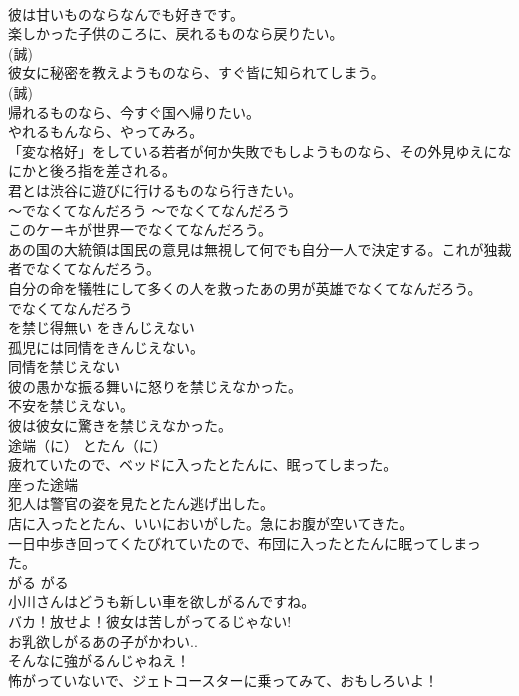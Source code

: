 \documentclass[8pt]{extreport}
\begin{document}
\begin{CJK}{UTF8}{min}
\\	彼は甘いものならなんでも好きです。   
\\	楽しかった子供のころに、戻れるものなら戻りたい。  
\\	(誠)
\\	彼女に秘密を教えようものなら、すぐ皆に知られてしまう。  
\\	(誠)
\\	帰れるものなら、今すぐ国へ帰りたい。   
\\	やれるもんなら、やってみろ。  
\\	「変な格好」をしている若者が何か失敗でもしようものなら、その外見ゆえになにかと後ろ指を差される。  
\\	君とは渋谷に遊びに行けるものなら行きたい。  
\\	〜でなくてなんだろう	〜でなくてなんだろう	
\\	このケーキが世界一でなくてなんだろう。  
\\	あの国の大統領は国民の意見は無視して何でも自分一人で決定する。これが独裁者でなくてなんだろう。  
\\	自分の命を犠牲にして多くの人を救ったあの男が英雄でなくてなんだろう。  
\\	でなくてなんだろう 
\\	を禁じ得無い	をきんじえない	
\\	孤児には同情をきんじえない。  
\\	同情を禁じえない  
\\	彼の愚かな振る舞いに怒りを禁じえなかった。  
\\	不安を禁じえない。  
\\	彼は彼女に驚きを禁じえなかった。  
\\	途端（に）	とたん（に）	
\\	疲れていたので、ベッドに入ったとたんに、眠ってしまった。  
\\	座った途端  
\\	犯人は警官の姿を見たとたん逃げ出した。  
\\	店に入ったとたん、いいにおいがした。急にお腹が空いてきた。  
\\	一日中歩き回ってくたびれていたので、布団に入ったとたんに眠ってしまった。  
\\	がる	がる	
\\	小川さんはどうも新しい車を欲しがるんですね。  
\\	バカ！放せよ！彼女は苦しがってるじゃない!  
\\	お乳欲しがるあの子がかわい..  
\\	そんなに強がるんじゃねえ！  
\\	怖がっていないで、ジェトコースターに乗ってみて、おもしろいよ！  

\end{CJK}
\end{document}
